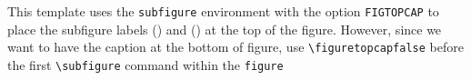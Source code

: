 %
%
%
%
%
%
%
%
This template uses the \texttt{subfigure} environment with the option
\texttt{FIGTOPCAP} to place the subfigure labels () and
() at the top of the figure. However, since we want to have the
caption at the bottom of figure, use \verb|\figuretopcapfalse|
before the first \verb|\subfigure| command within the \texttt{figure}
